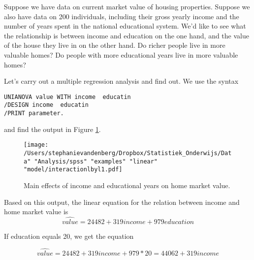 Suppose we have data on current market value of housing properties. Suppose we also have data on 200 individuals, including their gross yearly income and the number of years spent in the national educational system. We'd like to see what the relationship is between income and education on the one hand, and the value of the house they live in on the other hand. Do richer people live in more valuable homes? Do people with more educational years live in more valuable homes? 

\begin{kframe}


{\ttfamily\noindent\bfseries{}}

{\ttfamily\noindent\bfseries{}}\end{kframe}


Let's carry out a multiple regression analysis and find out. We use the syntax

\begin{verbatim}
UNIANOVA value WITH income  educatin
/DESIGN income  educatin 
/PRINT parameter.
\end{verbatim}

and find the output in Figure \ref{fig:interactionlbyl1}. 

\begin{figure}[h]
    \begin{center}
       \texttt{[image: /Users/stephanievandenberg/Dropbox/Statistiek\_Onderwijs/Data" "Analysis/spss" "examples"  "linear" "model/interactionlbyl1.pdf]}
    \end{center}
    \label{fig:interactionlbyl1}
    \caption{Main effects of income and educational years on home market value.}
\end{figure}

Based on this output, the linear equation for the relation between income and home market value is 
\begin{equation}
\widehat{value}= 24482 + 319 income + 979 education
\end{equation}

If education equals 20, we get the equation

\begin{equation}
\widehat{value}= 24482 + 319 income + 979 * 20 = 44062 + 319 income
\end{equation}

